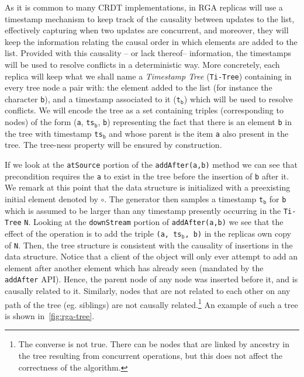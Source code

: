 As it is common to many CRDT implementations, in RGA replicas will use
a timestamp mechanism to keep track of the causality between updates
to the list, effectively capturing when two updates are concurrent,
and moreover, they will keep the information relating the causal order
in which elements are added to the list.
%
Provided with this causality -- or lack thereof-- information, the
timestamps will be used to resolve conflicts in a deterministic way.
%
More concretely, each replica will keep what we shall name a
\emph{Timestamp Tree} (\lstinline|Ti-Tree|) containing in every tree
node a pair with: the element added to the list (for instance the
character \lstinline|b|), and a timestamp associated to it
(\lstinline|t|$_{\mathtt{b}}$) which will be used to resolve
conflicts.
%
We will encode the tree as a set containing triples (corresponding to
nodes) of the form (\lstinline|a|, \lstinline|ts|$_{\mathtt{b}}$, \lstinline|b|)
representing the fact that there is an element \lstinline|b| in the
tree with timestamp \lstinline|ts|$_{\mathtt{b}}$ and whose parent is the item
\lstinline|a| also present in the tree.
%
The tree-ness property will be ensured by construction.


If we look at the \lstinline|atSource| portion of the
\lstinline|addAfter(a,b)| method we can see that precondition requires
the \lstinline|a| to exist in the tree before the insertion of
\lstinline|b| after it.
%
We remark at this point that the data structure is initialized with a
preexisting initial element denoted by $\circ$.
%
The generator then samples a timestamp \lstinline|t|$_{\mathtt{b}}$
for \lstinline|b| which is assumed to be larger than any
timestamp presently occurring in the \lstinline|Ti-Tree|
\lstinline|N|.
%
Looking at the \lstinline|downStream| portion of
\lstinline|addAfter(a,b)| we see that the effect of the operation is
to add the triple \lstinline|(a, ts|$_{\mathtt{b}}$\lstinline|, b)|
in the replicas own copy of \lstinline|N|.
%
Then, the tree structure is consistent with the causality of
insertions in the data structure.
%
Notice that a client of the object will only ever attempt to add an
element after another element which has already seen (mandated by the
\lstinline|addAfter| API).
%
Hence, the parent node of any node was inserted before it, and is
causally related to it.
%
Similarly, nodes that are not related to each other on any path of
the tree (eg. siblings) are not causally related.\footnote{The converse
  is not true. There can be nodes that are linked by ancestry in the
  tree resulting from concurrent operations, but this does not affect
  the correctness of the algorithm.}
%
An example of such a tree is shown in~\ref{fig:rga-tree}.

